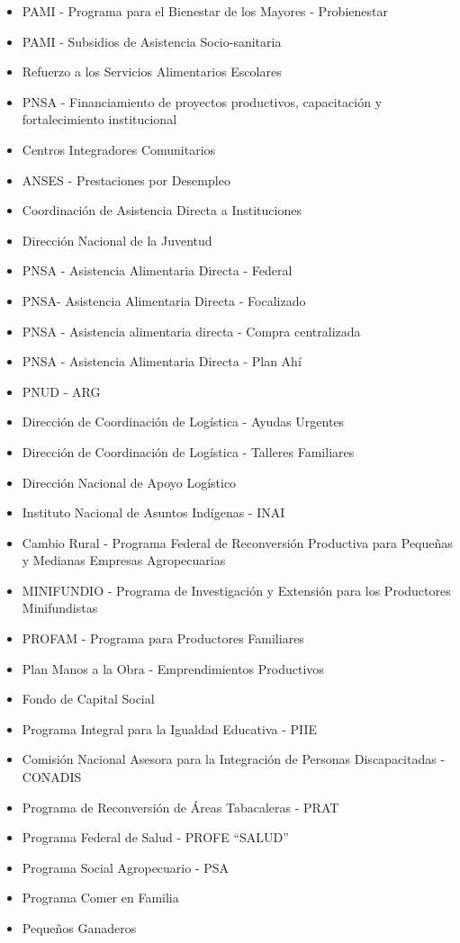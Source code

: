 \begin{itemize}
        \item PAMI - Programa para el Bienestar de los Mayores - Probienestar 
        \item PAMI - Subsidios de Asistencia Socio-sanitaria
        \item Refuerzo a los Servicios Alimentarios Escolares
        \item PNSA - Financiamiento de proyectos productivos, capacitación y fortalecimiento institucional
        \item Centros Integradores Comunitarios
        \item ANSES - Prestaciones por Desempleo
        \item Coordinación de Asistencia Directa a Instituciones
        \item Dirección Nacional de la Juventud
        \item PNSA - Asistencia Alimentaria Directa - Federal
        \item PNSA- Asistencia Alimentaria Directa - Focalizado
        \item PNSA - Asistencia alimentaria directa - Compra centralizada
        \item PNSA - Asistencia Alimentaria Directa -  Plan Ahí
        \item PNUD - ARG
        \item Dirección de Coordinación de Logística - Ayudas Urgentes
        \item Dirección de Coordinación de Logística - Talleres Familiares 
        \item Dirección Nacional de Apoyo Logístico
        \item Instituto Nacional de Asuntos Indígenas - INAI
        \item Cambio Rural - Programa Federal de Reconversión Productiva para Pequeñas y Medianas Empresas Agropecuarias 
        \item MINIFUNDIO -  Programa de Investigación y Extensión para los Productores Minifundistas
        \item PROFAM - Programa para Productores Familiares
        \item Plan Manos a la Obra - Emprendimientos Productivos
        \item Fondo de Capital Social
        \item Programa Integral para la Igualdad Educativa - PIIE
        \item Comisión Nacional Asesora para la Integración de Personas Discapacitadas - CONADIS
        \item Programa de Reconversión de Áreas Tabacaleras - PRAT
        \item Programa Federal de Salud - PROFE ``SALUD''
        \item Programa Social Agropecuario - PSA
        \item Programa Comer en Familia
        \item Pequeños Ganaderos
    \end{itemize}


